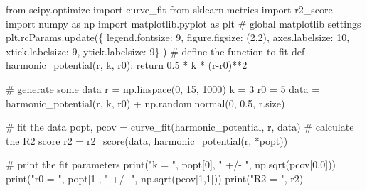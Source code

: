 \documentclass[
  letterpaper,
]{article}
\newenvironment{Shaded}{\begin{snugshade}}{\end{snugshade}}
\newcommand{\BuiltInTok}[1]{\textcolor[rgb]{0.00,0.23,0.31}{#1}}
\newcommand{\CommentTok}[1]{\textcolor[rgb]{0.37,0.37,0.37}{#1}}
\newcommand{\ControlFlowTok}[1]{\textcolor[rgb]{0.00,0.23,0.31}{#1}}
\newcommand{\DecValTok}[1]{\textcolor[rgb]{0.68,0.00,0.00}{#1}}
\newcommand{\FloatTok}[1]{\textcolor[rgb]{0.68,0.00,0.00}{#1}}
\newcommand{\ImportTok}[1]{\textcolor[rgb]{0.00,0.46,0.62}{#1}}
\newcommand{\KeywordTok}[1]{\textcolor[rgb]{0.00,0.23,0.31}{#1}}
\newcommand{\NormalTok}[1]{\textcolor[rgb]{0.00,0.23,0.31}{#1}}
\newcommand{\OperatorTok}[1]{\textcolor[rgb]{0.37,0.37,0.37}{#1}}
\newcommand{\StringTok}[1]{\textcolor[rgb]{0.13,0.47,0.30}{#1}}
\begin{document}
\begin{Shaded}
\begin{Highlighting}[]
\ImportTok{from}\NormalTok{ scipy.optimize }\ImportTok{import}\NormalTok{ curve\_fit}
\ImportTok{from}\NormalTok{ sklearn.metrics }\ImportTok{import}\NormalTok{ r2\_score}
\ImportTok{import}\NormalTok{ numpy }\ImportTok{as}\NormalTok{ np}
\ImportTok{import}\NormalTok{ matplotlib.pyplot }\ImportTok{as}\NormalTok{ plt}
\CommentTok{\# global matplotlib settings}
\NormalTok{plt.rcParams.update(\{}
    \StringTok{\textquotesingle{}legend.fontsize\textquotesingle{}}\NormalTok{: }\DecValTok{9}\NormalTok{,}
    \StringTok{\textquotesingle{}figure.figsize\textquotesingle{}}\NormalTok{: (}\DecValTok{2}\NormalTok{,}\DecValTok{2}\NormalTok{),}
    \StringTok{\textquotesingle{}axes.labelsize\textquotesingle{}}\NormalTok{: }\DecValTok{10}\NormalTok{,}
    \StringTok{\textquotesingle{}xtick.labelsize\textquotesingle{}}\NormalTok{: }\DecValTok{9}\NormalTok{,}
    \StringTok{\textquotesingle{}ytick.labelsize\textquotesingle{}}\NormalTok{: }\DecValTok{9}\NormalTok{\}}
\NormalTok{)}
\CommentTok{\# define the function to fit}
\KeywordTok{def}\NormalTok{ harmonic\_potential(r, k, r0):}
    \ControlFlowTok{return} \FloatTok{0.5} \OperatorTok{*}\NormalTok{ k }\OperatorTok{*}\NormalTok{ (r}\OperatorTok{{-}}\NormalTok{r0)}\OperatorTok{**}\DecValTok{2}

\CommentTok{\# generate some data}
\NormalTok{r }\OperatorTok{=}\NormalTok{ np.linspace(}\DecValTok{0}\NormalTok{, }\DecValTok{15}\NormalTok{, }\DecValTok{1000}\NormalTok{)}
\NormalTok{k }\OperatorTok{=} \DecValTok{3}
\NormalTok{r0 }\OperatorTok{=} \DecValTok{5}
\NormalTok{data }\OperatorTok{=}\NormalTok{ harmonic\_potential(r, k, r0) }\OperatorTok{+}\NormalTok{ np.random.normal(}\DecValTok{0}\NormalTok{, }\FloatTok{0.5}\NormalTok{, r.size)}

\CommentTok{\# fit the data}
\NormalTok{popt, pcov }\OperatorTok{=}\NormalTok{ curve\_fit(harmonic\_potential, r, data)}
\CommentTok{\# calculate the R2 score}
\NormalTok{r2 }\OperatorTok{=}\NormalTok{ r2\_score(data, harmonic\_potential(r, }\OperatorTok{*}\NormalTok{popt))}

\CommentTok{\# print the fit parameters}
\BuiltInTok{print}\NormalTok{(}\StringTok{"k = "}\NormalTok{, popt[}\DecValTok{0}\NormalTok{], }\StringTok{" +/{-} "}\NormalTok{, np.sqrt(pcov[}\DecValTok{0}\NormalTok{,}\DecValTok{0}\NormalTok{]))}
\BuiltInTok{print}\NormalTok{(}\StringTok{"r0 = "}\NormalTok{, popt[}\DecValTok{1}\NormalTok{], }\StringTok{" +/{-} "}\NormalTok{, np.sqrt(pcov[}\DecValTok{1}\NormalTok{,}\DecValTok{1}\NormalTok{]))}
\BuiltInTok{print}\NormalTok{(}\StringTok{"R2 = "}\NormalTok{, r2)}




\end{Highlighting}
\end{Shaded}
\end{document}
